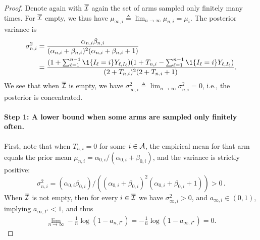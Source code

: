 \begin{proof}
	Denote again with $\overline{\mathcal{I}}$ again the set of arms sampled only finitely many times. For $\overline{\mathcal{I}}$ empty, we thus have $\mu_{\infty, i} \triangleq \lim_{n \rightarrow \infty} \mu_{n,i} = \mu_i$. The posterior variance is
	\begin{align*}
	\sigma_{n,i}^2 &= \frac{\alpha_{n,i}\beta_{n,i}}{(\alpha_{n,i}+ \beta_{n,i})^2 (\alpha_{n,i} + \beta_{n,i} + 1)} \\
	&= \frac{(1 + \sum_{\ell=1}^{n-1} \1{\{ I_{\ell} = i \}} Y_{\ell,I_{\ell}}) (1 + T_{n,i} - \sum_{\ell=1}^{n-1} \1{\{ I_{\ell} = i \}} Y_{\ell,I_{\ell}})  }{ (2 + T_{n,i})^2 (2 + T_{n,i} +1)}.
	\end{align*}
	We see that when $\overline{\mathcal{I}}$ is empty, we have $\sigma_{\infty, i}^2 \triangleq \lim_{n \rightarrow \infty} \sigma_{n,i}^2 = 0$, i.e., the posterior is concentrated. 
	
\paragraph*{Step 1: A lower bound when some arms are sampled only finitely often.}
First, note that when $T_{n,i} = 0$ for some $i \in \mathcal{A}$, the empirical mean for that arm equals the prior mean $\mu_{n,i} = \alpha_{0,i} / (\alpha_{0,i} + \beta_{0,i})$, and the variance is strictly positive:
\[
    \sigma^2_{n,i} = (\alpha_{0,i}\beta_{0,i}) / \left( (\alpha_{0,i}+ \beta_{0,i})^2 (\alpha_{0,i} + \beta_{0,i} + 1)\right) > 0\,.
\] 
When $\overline{\mathcal{I}}$ is not empty, then for every $i \in \overline{\mathcal{I}}$ we have $\sigma_{\infty, i}^2 > 0$, and $a_{\infty, i} \in (0,1)$, implying $a_{\infty, I^\star} < 1$, and thus
\begin{align*}
\lim_{n \rightarrow \infty} - \frac{1}{n} \log \left( 1- a_{n,I^\star} \right) = - \frac{1}{n} \log \left( 1- a_{\infty,I^\star} \right) = 0.
\end{align*}


\end{proof}
